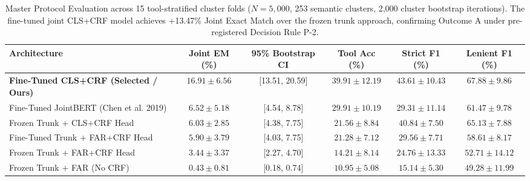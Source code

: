\begin{table}[t]
\centering
\small
\caption{Master Protocol Evaluation across 15 tool-stratified cluster folds ($N=5{,}000$, 253 semantic clusters, 2,000 cluster bootstrap iterations). The fine-tuned joint CLS+CRF model achieves +13.47\% Joint Exact Match over the frozen trunk approach, confirming Outcome A under pre-registered Decision Rule P-2.}
\label{tab:main_results}
\begin{tabular}{lccccc}
\toprule
\textbf{Architecture} & \textbf{Joint EM (\%)} & \textbf{95\% Bootstrap CI} & \textbf{Tool Acc (\%)} & \textbf{Strict F1 (\%)} & \textbf{Lenient F1 (\%)} \\
\midrule
\textbf{Fine-Tuned CLS+CRF (Selected / Ours)} & $16.91 \pm 6.56$ & [13.51, 20.59] & $39.91 \pm 12.19$ & $43.61 \pm 10.43$ & $67.88 \pm 9.86$ \\
Fine-Tuned JointBERT (Chen et al. 2019) & $6.52 \pm 5.18$ & [4.54, 8.78] & $29.91 \pm 10.19$ & $29.31 \pm 11.14$ & $61.47 \pm 9.78$ \\
Frozen Trunk + CLS+CRF Head & $6.03 \pm 2.85$ & [4.38, 7.75] & $21.56 \pm 8.84$ & $40.84 \pm 7.50$ & $65.13 \pm 7.88$ \\
Fine-Tuned Trunk + FAR+CRF Head & $5.90 \pm 3.79$ & [4.03, 7.75] & $21.28 \pm 7.12$ & $29.56 \pm 7.71$ & $58.61 \pm 8.17$ \\
Frozen Trunk + FAR+CRF Head & $3.44 \pm 3.37$ & [2.27, 4.70] & $14.21 \pm 8.14$ & $24.76 \pm 13.33$ & $52.71 \pm 14.12$ \\
Frozen Trunk + FAR (No CRF) & $0.43 \pm 0.81$ & [0.18, 0.74] & $10.95 \pm 5.08$ & $15.14 \pm 5.30$ & $49.28 \pm 11.99$ \\
\bottomrule
\end{tabular}
\end{table}
